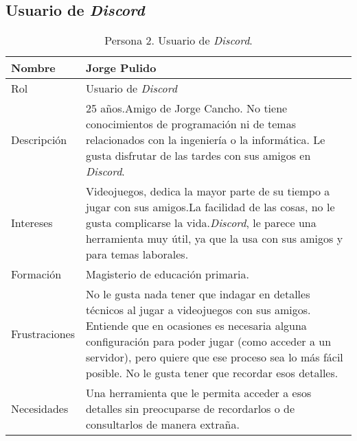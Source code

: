 \subsection{Usuario de \textit{Discord}}
\label{sec:personaUsuarioDiscord}
\begin{table}[H]
    \centering
    \def\arraystretch{1.25}
    \begin{adjustbox}{max width=\textwidth}
    \begin{tabularx}{\textwidth}{l|L}
    \hline
        \textbf{Nombre} & \textbf{Jorge Pulido} \\ \hline
    \hline
        Rol & Usuario de \textit{Discord} \\ \hline
        Descripción & 25 años.\linebreak Amigo de Jorge Cancho. No tiene conocimientos de programación ni de temas relacionados con la ingeniería o la informática. Le gusta disfrutar de las tardes con sus amigos en \textit{Discord}. \\ \hline
        Intereses & Videojuegos, dedica la mayor parte de su tiempo a jugar con sus amigos.\linebreak La facilidad de las cosas, no le gusta complicarse la vida.\linebreak \textit{Discord}, le parece una herramienta muy útil, ya que la usa con sus amigos y para temas laborales. \\ \hline
        Formación & Magisterio de educación primaria. \\ \hline
        Frustraciones & No le gusta nada tener que indagar en detalles técnicos al jugar a videojuegos con sus amigos. Entiende que en ocasiones es necesaria alguna configuración para poder jugar (como acceder a un servidor), pero quiere que ese proceso sea lo más fácil posible. No le gusta tener que recordar esos detalles. \\ \hline
        Necesidades & Una herramienta que le permita acceder a esos detalles sin preocuparse de recordarlos o de consultarlos de manera extraña. \\ \hline
    \end{tabularx}
    \end{adjustbox}
    \caption{Persona 2. Usuario de \textit{Discord}.}
\end{table}

